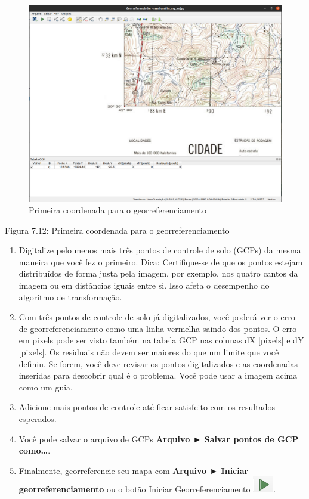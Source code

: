 \documentclass[
]{book}
\begin{document}
\begin{figure}
\centering
\includegraphics{media/modulo7/georef-3.png}
\caption{Primeira coordenada para o georreferenciamento}
\end{figure}

Figura 7.12: Primeira coordenada para o georreferenciamento

\begin{enumerate}
\def\labelenumi{\arabic{enumi}.}
\setcounter{enumi}{11}
\item
  Digitalize pelo menos mais três pontos de controle de solo (GCPs) da mesma maneira que você fez o primeiro. Dica: Certifique-se de que os pontos estejam distribuídos de forma justa pela imagem, por exemplo, nos quatro cantos da imagem ou em distâncias iguais entre si. Isso afeta o desempenho do algoritmo de transformação.
\item
  Com três pontos de controle de solo já digitalizados, você poderá ver o erro de georreferenciamento como uma linha vermelha saindo dos pontos. O erro em pixels pode ser visto também na tabela GCP nas colunas dX {[}pixels{]} e dY {[}pixels{]}. Os residuais não devem ser maiores do que um limite que você definiu. Se forem, você deve revisar os pontos digitalizados e as coordenadas inseridas para descobrir qual é o problema. Você pode usar a imagem acima como um guia.
\item
  Adicione mais pontos de controle até ficar satisfeito com os resultados esperados.
\item
  Você pode salvar o arquivo de GCPs \textbf{Arquivo ► Salvar pontos de GCP como\ldots{}}.
\item
  Finalmente, georreferencie seu mapa com \textbf{Arquivo ► Iniciar georreferenciamento} ou o botão Iniciar Georreferenciamento \includegraphics{media/modulo7/georef-start-btn.png}.
\end{enumerate}
\end{document}

